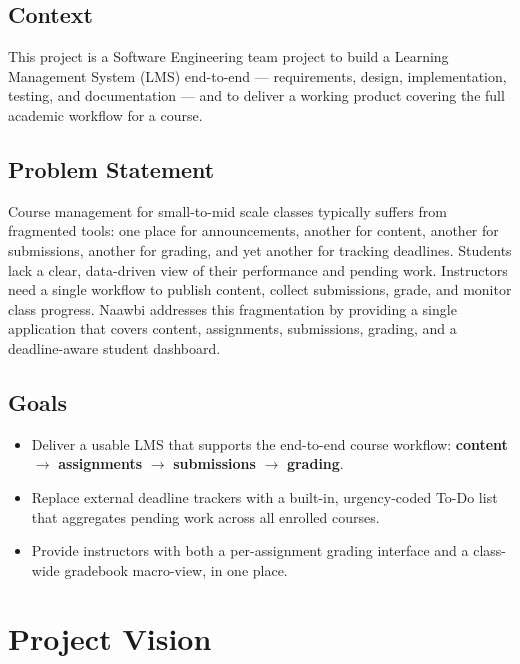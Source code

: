 \documentclass[12pt, a4paper]{article}
\begin{document}
\subsection{Context}
This project is a Software Engineering team project to build a Learning
Management System (LMS) end-to-end --- requirements, design, implementation,
testing, and documentation --- and to deliver a working product covering the
full academic workflow for a course.

\subsection{Problem Statement}
Course management for small-to-mid scale classes typically suffers from
fragmented tools: one place for announcements, another for content, another
for submissions, another for grading, and yet another for tracking deadlines.
Students lack a clear, data-driven view of their performance and pending work.
Instructors need a single workflow to publish content, collect submissions,
grade, and monitor class progress. Naawbi addresses this fragmentation by
providing a single application that covers content, assignments, submissions,
grading, and a deadline-aware student dashboard.

\subsection{Goals}
\begin{itemize}
  \item Deliver a usable LMS that supports the end-to-end course workflow:
        \textbf{content} $\rightarrow$ \textbf{assignments} $\rightarrow$
        \textbf{submissions} $\rightarrow$ \textbf{grading}.
  \item Replace external deadline trackers with a built-in, urgency-coded
        To-Do list that aggregates pending work across all enrolled courses.
  \item Provide instructors with both a per-assignment grading interface and
        a class-wide gradebook macro-view, in one place.
\end{itemize}

\section{Project Vision}
\end{document}
